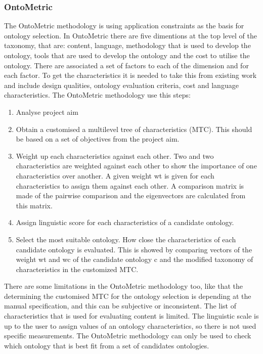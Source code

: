 \subsubsection{OntoMetric}
The OntoMetric methodology is using application constraints as the basis for ontology selection. In OntoMetric there are five dimentions at the top level of the taxonomy, that are: content, language, methodology that is used to develop the ontology, tools that are used to develop the ontology and the cost to utilise the ontology. There are associated a set of factors to each of the dimension and for each factor. To get the characteristics it is needed to take this from existing work and include design qualities, ontology evaluation criteria, cost and language characteristics. The OntoMetric methodology use this steps:
\begin{enumerate}%
	\item Analyse project aim
	\item Obtain a customised a multilevel tree of characteristics (MTC). This should be based on a set of objectives from the project aim.
	\item Weight up each characteristics against each other. Two and two characteristics are weighted against each other to show the importance of one characteristics over another. A given weight wt is given for each characteristics to assign them against each other. A comparison matrix is made of the pairwise comparison and the eigenvectors are calculated from this matrix.
	\item Assign linguistic score for each characteristics of a candidate ontology. 
	\item Select the most suitable ontology. How close the characteristics of each candidate ontology is evaluated. This is showed by comparing vectors of the weight wt and wc of the candidate ontology c and the modified taxonomy of characteristics in the customized MTC.
\end{enumerate}
There are some limitations in the OntoMetric methodology too, like that the determining the customised MTC for the ontology selection is depending at the manual specification, and this can be subjective or inconsistent. The list of characteristics that is used for evaluating content is limited. The linguistic scale is up to the user to assign values of an ontology characteristics, so there is not used specific measurements. The OntoMetric methodology can only be used to check which ontology that is best fit from a set of candidates ontologies. \cite{yu}